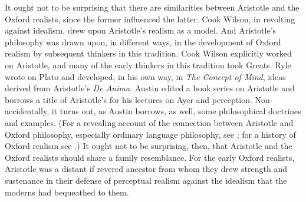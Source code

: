 It ought not to be surprising that there are similarities between Aristotle and the Oxford realists, since the former influenced the latter. Cook Wilson, in revolting against idealism, drew upon Aristotle's realism as a model. And Aristotle's philosophy was drawn upon, in different ways, in the development of Oxford realism by subsequent thinkers in this tradition. Cook Wilson explicitly worked on Aristotle, and many of the early thinkers in this tradition took Greats. Ryle wrote on Plato and developed, in his own way, in \emph{The Concept of Mind}, ideas derived from Aristotle's \emph{De Anima}. Austin edited a book series on Aristotle and borrows a title of Aristotle's for his lectures on Ayer and perception. Non-accidentally, it turns out, as Austin borrows, as well, some philosophical doctrines and examples. (For a revealing account of the connection between Aristotle and Oxford philosophy, especially ordinary language philosophy, see \citealt[Introduction]{Ackrill:1997tg}; for a history of Oxford realism see \citealt{Kalderon:2010fk}.) It ought not to be surprising, then, that Aristotle and the Oxford realists should share a family resemblance. For the early Oxford realists, Aristotle was a distant if revered ancestor from whom they drew strength and sustenance in their defense of perceptual realism against the idealism that the moderns had bequeathed to them.

